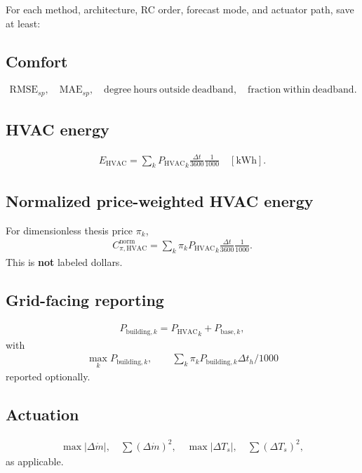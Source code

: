 \documentclass[11pt]{article}
\newcommand{\Ts}{T_s}
\newcommand{\mdot}{\dot m}
\newcommand{\PHVAC}{P_{\mathrm{HVAC}}}
\newcommand{\dt}{\Delta t}
\begin{document}
For each method, architecture, RC order, forecast mode, and actuator path, save at least:

\subsection*{Comfort}
\begin{align}
\mathrm{RMSE}_{sp},
\quad
\mathrm{MAE}_{sp},
\quad
\mathrm{degree\ hours\ outside\ deadband},
\quad
\mathrm{fraction\ within\ deadband}.
\end{align}

\subsection*{HVAC energy}
\begin{align}
\boxed{
E_{\mathrm{HVAC}}
=
\sum_k
{\PHVAC}_k
\frac{\dt}{3600}
\frac{1}{1000}
\quad[\mathrm{kWh}].
}
\tag{6.79}
\end{align}

\subsection*{Normalized price-weighted HVAC energy}
For dimensionless thesis price \(\pi_k\),
\begin{align}
\boxed{
C_{\pi,\mathrm{HVAC}}^{\mathrm{norm}}
=
\sum_k
\pi_k
{\PHVAC}_k
\frac{\dt}{3600}
\frac{1}{1000}.
}
\tag{6.80}
\end{align}
This is \textbf{not} labeled dollars.

\subsection*{Grid-facing reporting}
\begin{align}
P_{\mathrm{building},k}
=
{\PHVAC}_k+P_{\mathrm{base},k},
\end{align}
with
\begin{align}
\max_k P_{\mathrm{building},k},
\qquad
\sum_k\pi_kP_{\mathrm{building},k}\dt_h/1000
\end{align}
reported optionally.

\subsection*{Actuation}
\begin{align}
\max|\Delta\mdot|,
\quad
\sum(\Delta\mdot)^2,
\quad
\max|\Delta\Ts|,
\quad
\sum(\Delta\Ts)^2,
\end{align}
as applicable.
\end{document}
